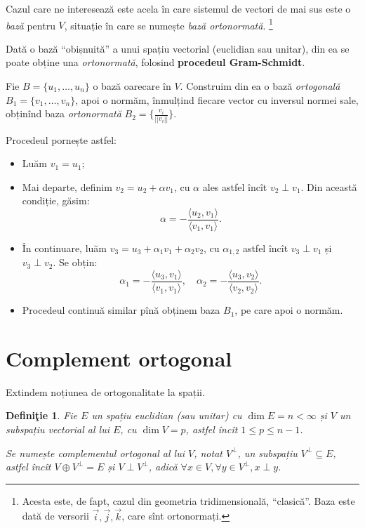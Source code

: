 \documentclass[11pt,a4paper]{article}
\newcommand\qq{\enquote}
\newcommand\seq{\subseteq}
\theoremstyle{dotless}
\theoremstyle{dotlessdr}
\newtheorem{definition}{Defini\c{t}ie}[section]
\begin{document}
Cazul care ne interesează este acela în care sistemul de vectori de mai
sus este o \emph{bază} pentru $V$, situație în care se numește
\emph{bază ortonormată}. \footnote{Acesta este, de fapt, cazul din geometria
  tridimensională, \qq{clasică}. Baza este dată de versorii $\vec{i}, \vec{j}, %
  \vec{k}$, care sînt ortonormați.}

Dată o bază \qq{obișnuită} a unui spațiu vectorial (euclidian sau unitar), din
ea se poate obține una \emph{ortonormată}, folosind \textbf{procedeul Gram-Schmidt}.

Fie $B = \{ u_1, \dots, u_n \}$ o bază oarecare în $V$. Construim din ea o bază
\emph{ortogonală} $B_1 = \{ v_1, \dots, v_n \}$, apoi o normăm, înmulțind fiecare
vector cu inversul normei sale, obținînd baza \emph{ortonormată} %
$B_2 = \{ \frac{v_i}{||v_i||} \}$.

Procedeul pornește astfel:
\begin{itemize}
\item Luăm $v_1 = u_1$;
\item Mai departe, definim $v_2 = u_2 + \alpha v_1$, cu $\alpha$ ales astfel
  încît $v_2 \perp v_1$. Din această condiție, găsim:
  \[
    \alpha = - \frac{\langle u_2, v_1 \rangle}{\langle v_1, v_1 \rangle}.
  \]
\item În continuare, luăm $v_3 = u_3 + \alpha_1 v_1 + \alpha_2 v_2$, cu $\alpha_{1,2}$
  astfel încît $v_3 \perp v_1$ și $v_3 \perp v_2$. Se obțin:
  \[
    \alpha_1 = -\frac{\langle u_3, v_1 \rangle}{\langle v_1, v_1 \rangle}, \quad %
    \alpha_2 = -\frac{\langle u_3, v_2 \rangle}{\langle v_2, v_2 \rangle}.
  \]
\item Procedeul continuă similar pînă obținem baza $B_1$, pe care apoi o normăm.
\end{itemize}


\section{Complement ortogonal}
\label{sec:compl-ort}

Extindem noțiunea de ortogonalitate la spații.

\begin{definition}\label{def:compl-ort}
  Fie $E$ un spațiu euclidian (sau unitar) cu $\dim E = n < \infty$ și $V$ un
  subspațiu vectorial al lui $E$, cu $\dim V = p$, astfel încît $1 \leq p \leq n - 1$.

  Se numește \emph{complementul ortogonal} al lui $V$, notat $V^\perp$, un
  subspațiu $V^\perp \seq E$, astfel încît $V \oplus V^\perp = E$ și
  $V \perp V^\perp$, adică $\forall x \in V, \forall y \in V^\perp, x \perp y$.
\end{definition}
\end{document}
